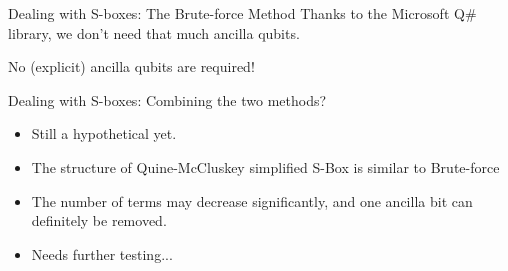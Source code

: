 \documentclass{beamer}
\begin{document}
    \begin{frame}{Dealing with S-boxes: The Brute-force Method}
    Thanks to the Microsoft Q\# library, we don't need that much ancilla qubits.
    \begin{center}
    \end{center}
    No (explicit) ancilla qubits are required!
    \end{frame}

    \begin{frame}{Dealing with S-boxes: Combining the two methods?}
        \begin{itemize}
            \item Still a hypothetical yet.
            \item The structure of Quine-McCluskey simplified S-Box is similar to Brute-force
            \item The number of terms may decrease significantly, and one ancilla bit can definitely be removed.
            \item Needs further testing...
        \end{itemize}
    \end{frame}
\end{document}
